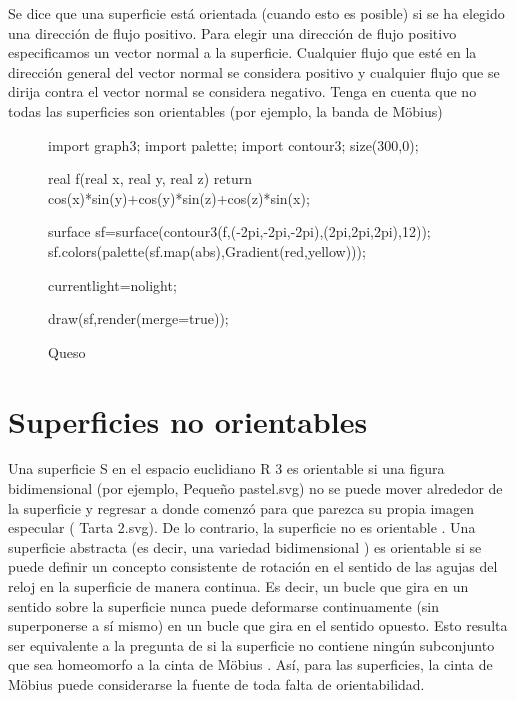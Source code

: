 Se dice que una superficie está orientada (cuando esto es posible) si se ha elegido una dirección de flujo positivo. Para elegir una dirección de flujo positivo especificamos un vector normal a la superficie. Cualquier flujo que esté en la dirección general del vector normal se considera positivo y cualquier flujo que se dirija contra el vector normal se considera negativo. Tenga en cuenta que no todas las superficies son orientables (por ejemplo, la banda de Möbius)

\begin{figure}[!ht]
	\begin{asy}
import graph3;
import palette;
import contour3;
size(300,0);

real f(real x, real y, real z) {
return cos(x)*sin(y)+cos(y)*sin(z)+cos(z)*sin(x);
}

surface sf=surface(contour3(f,(-2pi,-2pi,-2pi),(2pi,2pi,2pi),12));
sf.colors(palette(sf.map(abs),Gradient(red,yellow)));

currentlight=nolight;

draw(sf,render(merge=true));
	\end{asy}
	\caption{Queso}
\end{figure}


\section{Superficies no orientables}

 Una superficie S en el espacio euclidiano R 3 es orientable si una figura bidimensional (por ejemplo, Pequeño pastel.svg) no se puede mover alrededor de la superficie y regresar a donde comenzó para que parezca su propia imagen especular ( Tarta 2.svg). De lo contrario, la superficie no es orientable . Una superficie abstracta (es decir, una variedad bidimensional ) es orientable si se puede definir un concepto consistente de rotación en el sentido de las agujas del reloj en la superficie de manera continua. Es decir, un bucle que gira en un sentido sobre la superficie nunca puede deformarse continuamente (sin superponerse a sí mismo) en un bucle que gira en el sentido opuesto. Esto resulta ser equivalente a la pregunta de si la superficie no contiene ningún subconjunto que sea homeomorfo a la cinta de Möbius . Así, para las superficies, la cinta de Möbius puede considerarse la fuente de toda falta de orientabilidad.

